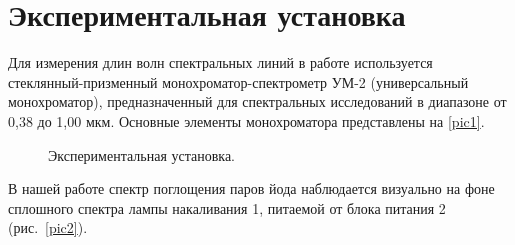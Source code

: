\documentclass[a4paper,12pt]{article} %
\begin{document}
\section{Экспериментальная установка}
	Для измерения длин волн спектральных линий в работе используется стеклянный-призменный монохроматор-спектрометр УМ-2 (универсальный монохроматор), предназначенный для спектральных исследований в диапазоне от 0,38 до 1,00 мкм. Основные элементы монохроматора представлены на \ref{pic1}.
	\begin{figure}[h!]
		{\caption{Экспериментальная установка.}}
	\end{figure}
	
	В нашей работе спектр поглощения паров йода наблюдается визуально на фоне сплошного спектра лампы накаливания 1, питаемой от блока питания 2 (рис.~\ref{pic2}).
	
\end{document}
